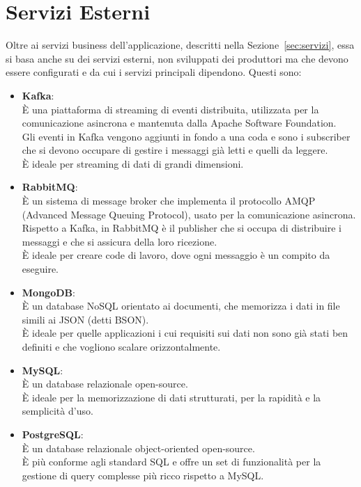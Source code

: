 \section{Servizi Esterni}
\label{sec:servizi_esterni}
Oltre ai servizi business dell'applicazione, descritti nella Sezione~\ref{sec:servizi}, essa si basa anche su dei servizi esterni, non sviluppati dei produttori ma che devono essere configurati e da cui i servizi principali dipendono. Questi sono:
\begin{itemize}
    \item \textbf{Kafka}: \\
        È una piattaforma di streaming di eventi distribuita, utilizzata per la comunicazione asincrona e mantenuta dalla Apache Software Foundation. \\
        Gli eventi in Kafka vengono aggiunti in fondo a una coda e sono i subscriber che si devono occupare di gestire i messaggi già letti e quelli da leggere. \\
        È ideale per streaming di dati di grandi dimensioni. \\
    \item \textbf{RabbitMQ}: \\
        È un sistema di message broker che implementa il protocollo AMQP (Advanced Message Queuing Protocol), usato per la comunicazione asincrona. \\
        Rispetto a Kafka, in RabbitMQ è il publisher che si occupa di distribuire i messaggi e che si assicura della loro ricezione. \\
        È ideale per creare code di lavoro, dove ogni messaggio è un compito da eseguire. \\
    \item \textbf{MongoDB}: \\
        È un database NoSQL orientato ai documenti, che memorizza i dati in file simili ai JSON (detti BSON). \\
        È ideale per quelle applicazioni i cui requisiti sui dati non sono già stati ben definiti e che vogliono scalare orizzontalmente. \\
    \item \textbf{MySQL}: \\
        È un database relazionale open-source. \\
        È ideale per la memorizzazione di dati strutturati, per la rapidità e la semplicità d'uso.
    \item \textbf{PostgreSQL}: \\
        È un database relazionale object-oriented open-source. \\
        È più conforme agli standard SQL e offre un set di funzionalità per la gestione di query complesse più ricco rispetto a MySQL.
\end{itemize}

